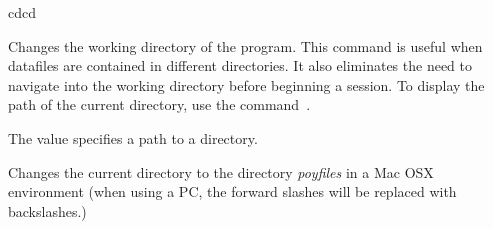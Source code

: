 \begin{command}{cd}{cd}

	\syntax{\obligatory{(\poystring)}}

	\begin{poydescription}
            Changes the working directory of the program. This command is useful
            when datafiles are contained in different directories. It also
            eliminates the need to navigate into the working directory before
            beginning a \poy session. To display the path of the current
            directory, use the command~.
	\end{poydescription}

	\begin{arguments}
            {The value specifies a path to a directory.}
            {}
	\end{arguments}
	
	\begin{poyexamples}

            {Changes the current directory to the directory \emph{poyfiles} in a Mac OSX 
            environment (when using a PC, the forward slashes will be replaced with backslashes.)}
            

    \end{poyexamples}

    \begin{poyalso}
    \end{poyalso}

\end{command}

